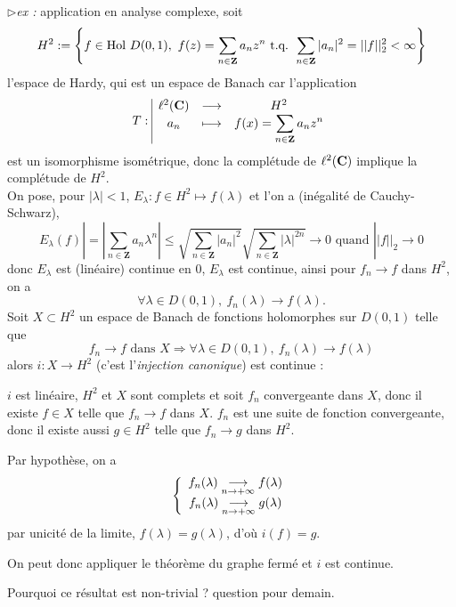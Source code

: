 \documentclass[a4paper,11pt, twoside]{article}
\begin{document}
$\triangleright$\emph{ex :} application en analyse complexe, soit 
$$H^2:=\left\{f\in\mathrm{Hol}\ D(0,1),\ f(z)=\sum_{n\in\mathbf Z}a_n z^n \tq \sum_{n\in\mathbf Z}|a_n|^2=||f||_2^2<\infty\right\}$$
l'espace de Hardy, qui est un espace de Banach car l'application
$$T:\begin{array}{|ccc}
  \ell^2(\mathbf C)&\longrightarrow&H^2\\
   a_n&\longmapsto&f(x)=\displaystyle\sum_{n\in\mathbf Z}a_n z^n
\end{array}$$
est un isomorphisme isométrique, donc la complétude de $ \ell^2(\mathbf C)$ implique la complétude de $H^2$.\\

On pose, pour $|\lambda|<1$, $E_\lambda:f\in H^2\longmapsto f(\lambda)$ et l'on a (inégalité de Cauchy-Schwarz),
$$E_{\lambda}(f)|=\left|\sum_{n\in\mathbf Z}a_n\lambda^n\right|\leqslant \sqrt{\sum_{n\in\mathbf Z}|a_n|^2}\sqrt{\sum_{n\in\mathbf Z}|\lambda|^{2n}}\longrightarrow 0\text{ quand }||f||_2\to 0$$
donc $E_\lambda$ est (linéaire) continue en 0, $E_\lambda$ est continue, ainsi pour $f_n\to f$ dans $H^2$, on a 
$$\forall \lambda\in D(0,1),\ f_n(\lambda)\longrightarrow f(\lambda).$$
Soit $X\subset H^2$ un espace de Banach de fonctions holomorphes sur $D(0,1)$ telle que 
$$f_n\longrightarrow f\text{ dans }X\Rightarrow\forall \lambda\in D(0,1),\ f_n(\lambda)\longrightarrow f(\lambda)$$
alors $i:X\longrightarrow H^2$ (c'est l'\emph{injection canonique}) est continue :

\begin{Proof}
  $i$ est linéaire, $H^2$ et $X$ sont complets et soit $f_n$ convergeante dans $X$, donc il existe $f\in X$ telle que $f_n\longrightarrow f$ dans $X$. $f_n$ est une suite de fonction convergeante, donc il existe aussi $g\in H^2$ telle que $f_n\longrightarrow g$ dans $H^2$.

  Par hypothèse, on a 
  $$\left\{\begin{array}{c}
    f_n(\lambda)\underset{n\to+\infty}{\longrightarrow} f(\lambda)\\
    f_n(\lambda)\underset{n\to+\infty}{\longrightarrow} g(\lambda)
  \end{array}\right.$$
  par unicité de la limite, $f(\lambda)=g(\lambda)$, d'où $i(f)=g$.

  On peut donc appliquer le théorème du graphe fermé et $i$ est continue.
\end{Proof}


Pourquoi ce résultat est non-trivial ? question pour demain.



\end{document}
